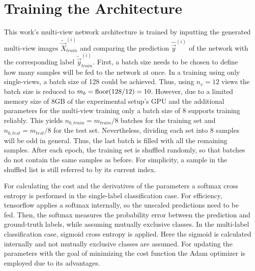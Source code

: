 \section{Training the Architecture}
\label{sec:methods-training}
This work's multi-view network architecture is trained by inputting the generated multi-view images $\tilde{\vec{X}}_{train}^{(i)}$ and comparing the prediction $\hat{\vec{y}}^{(i)}$ of the network with the corresponding label $\tilde{\vec{y}}_{train}^{(i)}$.
First, a batch size needs to be chosen to define how many samples will be fed to the network at once.
In a training using only single-views, a batch size of 128 could be achieved.
Thus, using $n_v = 12$ views the batch size is reduced to $m_b = \operatorname{floor}(128 / 12) = 10$.
However, due to a limited memory size of 8GB of the experimental setup's GPU and the additional parameters for the multi-view training only a batch size of 8 supports training reliably.
This yields $n_{b,train} = m_{train} / 8$ batches for the training set and $n_{b,test} = m_{test} / 8$ for the test set.
Nevertheless, dividing each set into 8 samples will be odd in general.
Thus, the last batch is filled with all the remaining samples.
After each epoch, the training set is shuffled randomly, so that batches do not contain the same samples as before.
For simplicity, a sample in the shuffled list is still referred to by its current index.

For calculating the cost and the derivatives of the parameters a softmax cross entropy is performed in the single-label classification case.
For efficiency, tensorflow applies a softmax internally, so the unscaled predictions need to be fed.
Then, the softmax measures the probability error between the prediction and ground-truth labels, while assuming mutually exclusive classes.
In the multi-label classification case, sigmoid cross entropy is applied.
Here the sigmoid is calculated internally and not mutually exclusive classes are assumed.
For updating the parameters with the goal of minimizing the cost function the Adam optimizer is employed due to its advantages.

